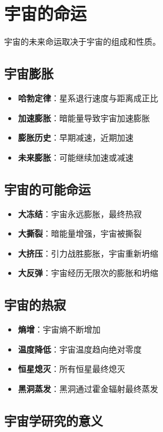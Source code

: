 \documentclass[12pt,UTF8]{ctexbook}
\begin{document}
\section{宇宙的命运}

宇宙的未来命运取决于宇宙的组成和性质。

\subsection{宇宙膨胀}

\begin{itemize}
  \item \textbf{哈勃定律}：星系退行速度与距离成正比
  \item \textbf{加速膨胀}：暗能量导致宇宙加速膨胀
  \item \textbf{膨胀历史}：早期减速，近期加速
  \item \textbf{未来膨胀}：可能继续加速或减速
\end{itemize}

\subsection{宇宙的可能命运}

\begin{itemize}
  \item \textbf{大冻结}：宇宙永远膨胀，最终热寂
  \item \textbf{大撕裂}：暗能量增强，宇宙被撕裂
  \item \textbf{大挤压}：引力战胜膨胀，宇宙重新坍缩
  \item \textbf{大反弹}：宇宙经历无限次的膨胀和坍缩
\end{itemize}

\subsection{宇宙的热寂}

\begin{itemize}
  \item \textbf{熵增}：宇宙熵不断增加
  \item \textbf{温度降低}：宇宙温度趋向绝对零度
  \item \textbf{恒星熄灭}：所有恒星最终熄灭
  \item \textbf{黑洞蒸发}：黑洞通过霍金辐射最终蒸发
\end{itemize}

\subsection{宇宙学研究的意义}
\end{document}
